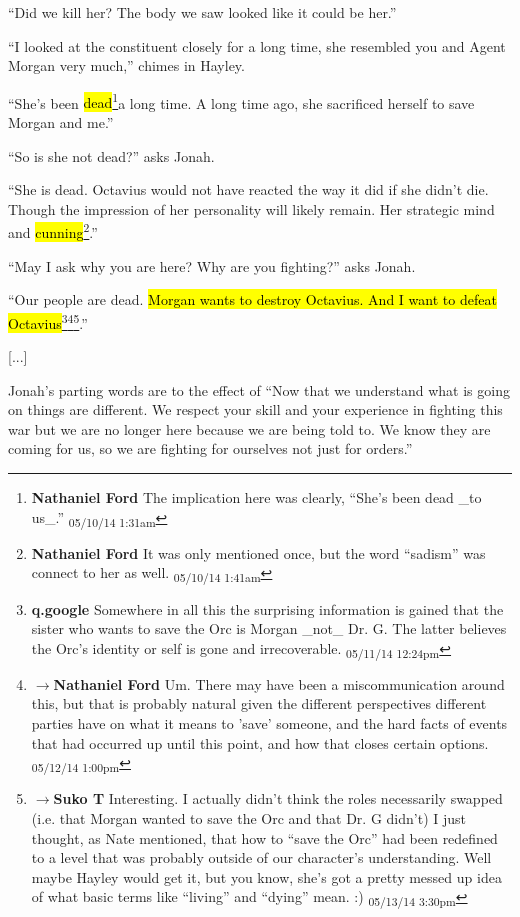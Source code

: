 ``Did we kill her?  The body we saw looked like it could be her.''

``I looked at the constituent closely for a long time, she resembled you and Agent Morgan very much,'' chimes in Hayley.

``She's been \hl{dead}\footnote{\textbf{Nathaniel Ford }The implication here was clearly, ``She's been dead \_to us\_.'' \textsubscript{05/10/14 1:31am}}a long time.  A long time ago, she sacrificed herself to save Morgan and me.''

``So is she not dead?'' asks Jonah.

``She is dead.  Octavius would not have reacted the way it did if she didn't die. Though the impression of her personality will likely remain.  Her strategic mind and \hl{cunning}\footnote{\textbf{Nathaniel Ford }It was only mentioned once, but the word ``sadism'' was connect to her as well. \textsubscript{05/10/14 1:41am}}.''

``May I ask why you are here? Why are you fighting?'' asks Jonah.

``Our people are dead.  \hl{Morgan wants to destroy Octavius. And I want to defeat Octavius}\footnote{\textbf{q.google }Somewhere in all this the surprising information is gained that the sister who wants to save the Orc is Morgan \_not\_ Dr. G.  The latter believes the Orc's identity or self is gone and irrecoverable. \textsubscript{05/11/14 12:24pm}}\footnote{$\rightarrow$\textbf{Nathaniel Ford }Um. There may have been a miscommunication around this, but that is probably natural given the different perspectives different parties have on what it means to 'save' someone, and the hard facts of events that had occurred up until this point, and how that closes certain options. \textsubscript{05/12/14 1:00pm}}\footnote{$\rightarrow$\textbf{Suko T }Interesting.  I actually didn't think the roles necessarily swapped (i.e. that Morgan wanted to save the Orc and that Dr. G didn't) I just thought, as Nate mentioned, that how to ``save the Orc'' had been redefined to a level that was probably outside of our character's understanding.  Well maybe Hayley would get it, but you know, she's got a pretty messed up idea of what basic terms like ``living'' and ``dying'' mean. :) \textsubscript{05/13/14 3:30pm}}.''

{[}...{]}

Jonah's parting words are to the effect of ``Now that we understand what is going on things are different.  We respect your skill and your experience in fighting this war but we are no longer here because we are being told to. We know they are coming for us, so we are fighting for ourselves not just for orders.''

